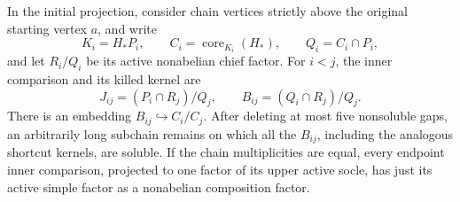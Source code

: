 \begin{lemma}\label{cls:core-gaps}
In the initial projection, consider chain vertices strictly above the
original starting vertex $a$, and write
\[
 K_i=H_*P_i,\qquad C_i=\operatorname{core}_{K_i}(H_*),
 \qquad Q_i=C_i\cap P_i,
\]
and let $R_i/Q_i$ be its active nonabelian chief factor.  For $i<j$,
the inner comparison and its killed kernel are
\[
 J_{ij}=(P_i\cap R_j)/Q_j,
 \qquad B_{ij}=(Q_i\cap R_j)/Q_j.
\]
There is an embedding $B_{ij}\hookrightarrow C_i/C_j$.
After deleting at most five nonsoluble gaps, an arbitrarily long
subchain remains on which all the $B_{ij}$, including the analogous
shortcut kernels, are soluble.  If the chain multiplicities are
equal, every endpoint inner comparison, projected to one factor of
its upper active socle, has just its active simple factor as a
nonabelian composition factor.
\end{lemma}
